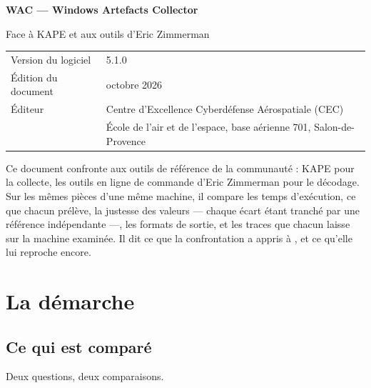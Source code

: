 \documentclass[11pt,a4paper,oneside]{report}
\begin{document}

\thispagestyle{empty}
\vspace*{\fill}
{\color{marine}\Large\bfseries WAC — Windows Artefacts Collector}\par
{\color{bleu}Face à KAPE et aux outils d'Eric Zimmerman}\par
\medskip
\begin{tabular}{@{}ll@{}}
Version du logiciel & 5.1.0 \\
Édition du document & octobre 2026 \\
Éditeur & Centre d'Excellence Cyberdéfense Aérospatiale (CEC) \\
        & École de l'air et de l'espace, base aérienne 701, Salon-de-Provence \\
\end{tabular}

\bigskip
{\small\color{gris}Ce document confronte \wac{} aux outils de référence de la
communauté : KAPE pour la collecte, les outils en ligne de commande d'Eric
Zimmerman pour le décodage. Sur les mêmes pièces d'une même machine, il compare
les temps d'exécution, ce que chacun prélève, la justesse des valeurs --- chaque
écart étant tranché par une référence indépendante ---, les formats de sortie, et
les traces que chacun laisse sur la machine examinée. Il dit ce que la
confrontation a appris à \wac{}, et ce qu'elle lui reproche encore.}
\vspace*{2cm}
\clearpage

\tableofcontents

\chapter{La démarche}

\section{Ce qui est comparé}

Deux questions, deux comparaisons.
\end{document}
